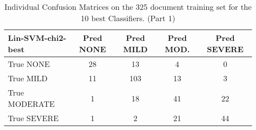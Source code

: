 {\begin{table}[]
\begin{tabular}{|l|c|c|c|c|}
   \hline
   \cellcolor{gray!15} \textsf{Lin-SVM-chi2-best} & \textsf{Pred NONE} & \textsf{Pred MILD} & \textsf{Pred MOD.} & \textsf{Pred SEVERE} \\
   \hline
   \textsf{True NONE} & \cellcolor{gray!15} 28 & 13 & 4 & 0 \\
   \textsf{True MILD} & 11 & \cellcolor{gray!15} 103 & 13 & 3 \\
   \textsf{True MODERATE} & 1 & 18 & \cellcolor{gray!15} 41 & 22 \\
   \textsf{True SEVERE} & 1 & 2 & 21 & \cellcolor{gray!15} 44 \\
   \hline
   \end{tabular}
    \caption{Individual Confusion Matrices on the 325 document training set for the 10 best Classifiers. (Part 1)}
   \label{tab:BestEnsembleClassifiersConfusionMatrix}
\end{table}

}
